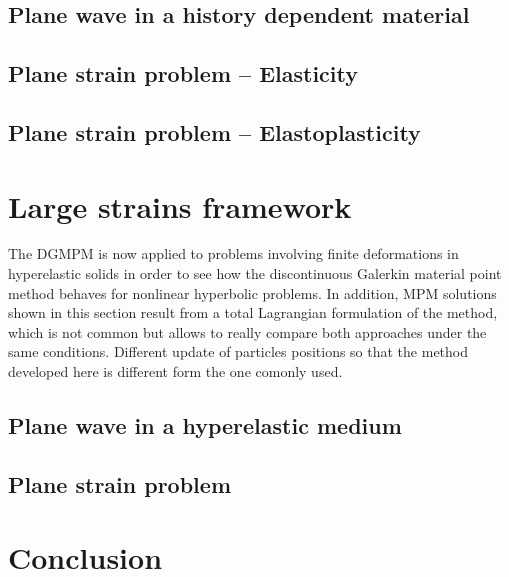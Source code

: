 \subsection{Plane wave in a history dependent material}
\label{subsec:hpp_planewave}


\subsection{Plane strain problem -- Elasticity}
\label{subsec:el_planestrain}


\subsection{Plane strain problem -- Elastoplasticity}
\label{subsec:ep_planestrain}


\section{Large strains framework}
\label{sec:he_simulations}
The DGMPM is now applied to problems involving finite deformations in hyperelastic solids in order to see how the discontinuous Galerkin material point method behaves for nonlinear hyperbolic problems.
%
In addition, MPM solutions shown in this section result from a total Lagrangian formulation of the method, which is not common but allows to really compare both approaches under the same conditions. Different update of particles positions so that the method developed here is different form the one comonly used.
\subsection{Plane wave in a hyperelastic medium}
\label{subsec:he_planewave}


\subsection{Plane strain problem}
\label{subsec:he_plate}




\section{Conclusion}
